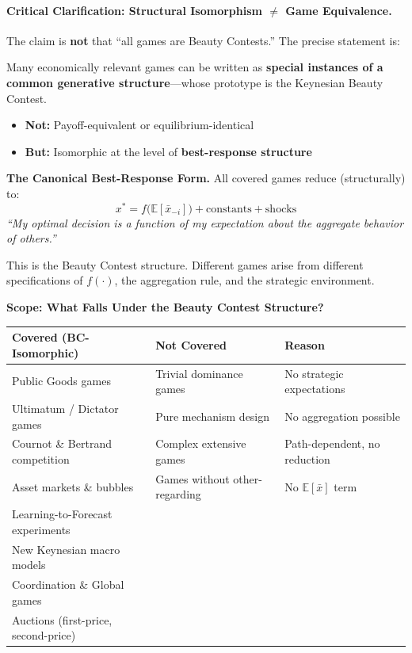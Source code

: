 \paragraph{Critical Clarification: Structural Isomorphism $\neq$ Game Equivalence.}

The claim is \textbf{not} that ``all games are Beauty Contests.'' The precise statement is:

\begin{tcolorbox}[colback=gray!5!white, colframe=gray!75!black,
    title=\textbf{The Precise Claim}]

Many economically relevant games can be written as \textbf{special instances of a common
generative structure}---whose prototype is the Keynesian Beauty Contest.

\begin{itemize}[nosep]
    \item \textbf{Not:} Payoff-equivalent or equilibrium-identical
    \item \textbf{But:} Isomorphic at the level of \textbf{best-response structure}
\end{itemize}

\end{tcolorbox}

\textbf{The Canonical Best-Response Form.}
All covered games reduce (structurally) to:
\begin{equation}
x^* = f\bigl(\mathbb{E}[\bar{x}_{-i}]\bigr) + \text{constants} + \text{shocks}
\label{eq:bc-canonical}
\end{equation}
\textit{``My optimal decision is a function of my expectation about the aggregate behavior of others.''}

This is the Beauty Contest structure. Different games arise from different specifications of $f(\cdot)$,
the aggregation rule, and the strategic environment.

\textbf{Scope: What Falls Under the Beauty Contest Structure?}

\begin{center}
\renewcommand{\arraystretch}{1.3}
\begin{tabular}{@{}p{5.5cm}p{5.5cm}p{2.5cm}@{}}
\toprule
\textbf{Covered (BC-Isomorphic)} & \textbf{Not Covered} & \textbf{Reason} \\
\midrule
Public Goods games & Trivial dominance games & No strategic expectations \\
Ultimatum / Dictator games & Pure mechanism design & No aggregation possible \\
Cournot \& Bertrand competition & Complex extensive games & Path-dependent, no reduction \\
Asset markets \& bubbles & Games without other-regarding & No $\mathbb{E}[\bar{x}]$ term \\
Learning-to-Forecast experiments & & \\
New Keynesian macro models & & \\
Coordination \& Global games & & \\
Auctions (first-price, second-price) & & \\
\bottomrule
\end{tabular}
\end{center}

